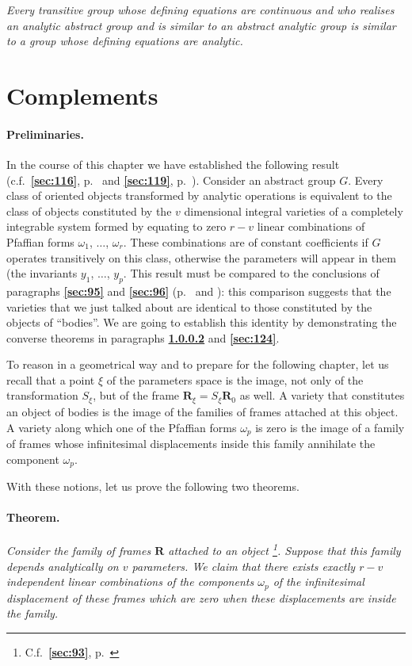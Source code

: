 \documentclass[leqno,11pt]{book}
\numberwithin{equation}{chapter}
\theoremstyle{shape1}
\theoremstyle{shapesmall}
\newcommand{\fsref}[1]{{\rm\textsection\textbf{\ref{sec:#1}}}}
\newcommand{\somespace}{\vspace{9pt}}
\begin{document}
\somespace

\emph{Every transitive group whose defining equations are continuous and who realises an analytic abstract group and is similar to an abstract analytic group is similar to a group whose defining equations are analytic.}


\section{Complements}
\label{sec:complements}

\paragraph{Preliminaries.}
\label{sec:122}
In the course of this chapter we have established the following result (c.f.~\fsref{116}, p.~\pageref{sec:116} and \fsref{119}, p.~\pageref{sec:119}). Consider an abstract group $G$. Every class of oriented objects transformed by analytic operations is equivalent to the class of objects constituted by the $v$ dimensional integral varieties of a completely integrable system formed by equating to zero $r-v$ linear combinations of Pfaffian forms $\omega_{1}$, $\dots$, $\omega_{r}$. These combinations are of constant coefficients if $G$ operates transitively on this class, otherwise the parameters will appear in them (the invariants $y_{1}$, $\dots$, $y_{p}$. This result must be compared to the conclusions of paragraphs \fsref{95} and \fsref{96} (p.~\pageref{sec:95} and \pageref{sec:96}): this comparison suggests that the varieties that we just talked about are identical to those constituted by the objects of ``bodies''. We are going to establish this identity by demonstrating the converse theorems in paragraphs \fsref{123} and \fsref{124}.

To reason in a geometrical way and to prepare for the following chapter, let us recall that a point $\xi$ of the parameters space is the image, not only of the transformation $S_{\xi}$, but of the frame $\mathbf{R}_{\xi}=S_{\xi}\mathbf{R}_{0}$ as well. A variety that constitutes an object of bodies is the image of the families of frames attached at this object. A variety along which one of the Pfaffian forms $\omega_{p}$ is zero is the image of a family of frames whose infinitesimal displacements inside this family annihilate the component $\omega_{p}$.

With these notions, let us prove the following two theorems.


\paragraph{Theorem.}
\label{sec:123}
\emph{Consider the family of frames $\mathbf{R}$ attached to an object \footnote{C.f.~\fsref{93}, p.~\pageref{sec:93}}. Suppose that this family depends analytically on $v$ parameters. We claim that there exists exactly $r-v$ independent linear combinations of the components $\omega_{p}$ of the infinitesimal displacement of these frames which are zero when these displacements are inside the family.}
\end{document}
